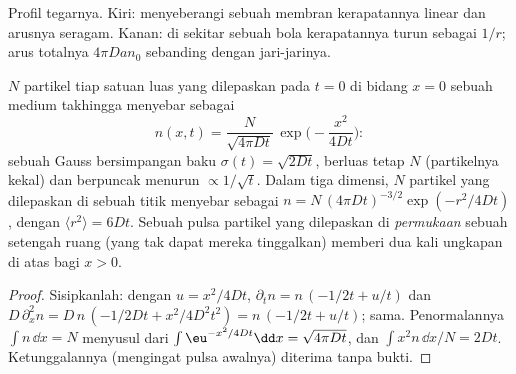 \begin{omfigure}

{\small Profil tegarnya. Kiri: menyeberangi sebuah membran kerapatannya
linear dan arusnya seragam. Kanan: di sekitar sebuah bola kerapatannya
turun sebagai $1/r$; arus totalnya $4\pi D a n_0$ sebanding dengan
jari-jarinya.}
\end{omfigure}

\begin{proposition}\label{prop:b2:particle-diffusion:gaussian}
$N$ partikel tiap satuan luas yang dilepaskan pada $t = 0$ di bidang $x = 0$ sebuah
medium takhingga menyebar sebagai
\[
n(x,t) = \frac{N}{\sqrt{4\pi D t}}\,\exp\Big(-\frac{x^2}{4Dt}\Big) :
\]
sebuah Gauss bersimpangan baku $\sigma(t) = \sqrt{2Dt}$, berluas tetap
$N$ (partikelnya kekal) dan berpuncak menurun $\propto
1/\sqrt t$. Dalam tiga dimensi, $N$ partikel yang dilepaskan di sebuah titik
menyebar sebagai $n = N\,(4\pi Dt)^{-3/2}\exp(-r^2/4Dt)$, dengan $\langle r^2
\rangle = 6Dt$. Sebuah pulsa partikel yang dilepaskan di \emph{permukaan}
sebuah setengah ruang (yang tak dapat mereka tinggalkan) memberi dua kali ungkapan di atas
bagi $x > 0$.
\end{proposition}

\begin{proof}
Sisipkanlah: dengan $u = x^2/4Dt$, $\partial_t n = n\,(-1/2t + u/t)$ dan
$D\,\partial_x^2 n = D\,n\,(-1/2Dt + x^2/4D^2t^2) = n\,(-1/2t + u/t)$;
sama. Penormalannya $\int n\,\dd x = N$ menyusul dari $\int
\eu^{-x^2/4Dt}\dd x = \sqrt{4\pi Dt}$, dan $\int x^2 n\,\dd x/N = 2Dt$.
Ketunggalannya (mengingat pulsa awalnya) diterima tanpa bukti.
\end{proof}

